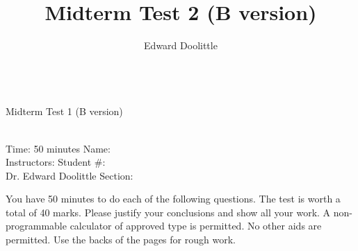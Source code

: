 \documentclass[12pt]{article}
\title{Midterm Test 2 (B version)}
\author{Edward Doolittle}
\begin{document}
\thispagestyle{plain}

\begin{center}
  \quad\\
  \LARGE{Midterm Test 1 (B version)}
\end{center}

\begin{flushleft}
\quad\\
Time: 50 minutes                \hfill       Name: \underline{\hspace{2in}}  \\
Instructors:                    \hfill Student \#: \underline{\hspace{2in}}  \\
\quad Dr. Edward Doolittle      \hfill    Section: \underline{\hspace{2in}}  \\
\end{flushleft}


\noindent
You have 50 minutes to do each of the following questions.
The test is worth a total of 40 marks.
Please justify your conclusions and
show all your work.
A non-programmable calculator of approved type is permitted.  No other aids
are permitted.
Use the backs of the pages for rough work.
\end{document}
